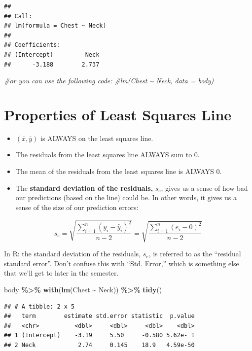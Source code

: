 \documentclass[
]{book}
\newenvironment{Shaded}{\begin{snugshade}}{\end{snugshade}}
\newcommand{\CommentTok}[1]{\textcolor[rgb]{0.56,0.35,0.01}{\textit{#1}}}
\newcommand{\FunctionTok}[1]{\textcolor[rgb]{0.13,0.29,0.53}{\textbf{#1}}}
\newcommand{\NormalTok}[1]{#1}
\newcommand{\SpecialCharTok}[1]{\textcolor[rgb]{0.81,0.36,0.00}{\textbf{#1}}}
\begin{document}
\begin{verbatim}
## 
## Call:
## lm(formula = Chest ~ Neck)
## 
## Coefficients:
## (Intercept)         Neck  
##      -3.188        2.737
\end{verbatim}

\begin{Shaded}
\begin{Highlighting}[]
\CommentTok{\#or you can use the following code:}
\CommentTok{\#lm(Chest \textasciitilde{} Neck, data = body)}
\end{Highlighting}
\end{Shaded}

\section{Properties of Least Squares Line}\label{properties-of-least-squares-line}

\begin{itemize}
\item
  \((\bar{x},\bar{y})\) is ALWAYS on the least squares line.
\item
  The residuals from the least squares line ALWAYS sum to 0.
\item
  The mean of the residuals from the least squares line is ALWAYS 0.
\item
  The \textbf{standard deviation of the residuals,} \(s_e\), gives us a sense of how bad our predictions (based on the line) could be. In other words, it gives us a sense of the size of our prediction errors:
\end{itemize}

\[s_e = \sqrt{\frac{\sum^n_{i=1} (y_i-\hat{y}_i)^2}{n-2}}  = \sqrt{\frac{\sum^n_{i=1} (e_i-0)^2}{n-2}} \]

In R: the standard deviation of the residuals, \(s_e\), is referred to as the ``residual standard error''. Don't confuse this with ``Std. Error,'' which is something else that we'll get to later in the semester.

\begin{Shaded}
\begin{Highlighting}[]
\NormalTok{body }\SpecialCharTok{\%\textgreater{}\%}
    \FunctionTok{with}\NormalTok{(}\FunctionTok{lm}\NormalTok{(Chest }\SpecialCharTok{\textasciitilde{}}\NormalTok{ Neck)) }\SpecialCharTok{\%\textgreater{}\%} 
    \FunctionTok{tidy}\NormalTok{()}
\end{Highlighting}
\end{Shaded}

\begin{verbatim}
## # A tibble: 2 x 5
##   term        estimate std.error statistic  p.value
##   <chr>          <dbl>     <dbl>     <dbl>    <dbl>
## 1 (Intercept)    -3.19     5.50     -0.580 5.62e- 1
## 2 Neck            2.74     0.145    18.9   4.59e-50
\end{verbatim}
\end{document}
